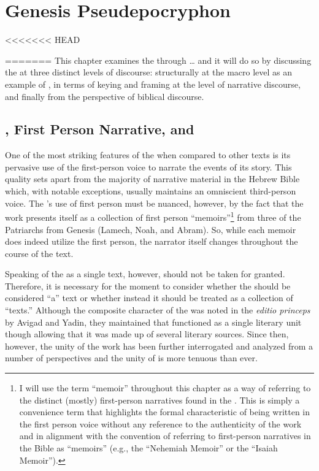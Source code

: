 
\chapter{Genesis Pseudepocryphon}

<<<<<<< HEAD




=======
 This chapter examines the \ga through \ldots{} and it will do so by discussing the \ga at three distinct levels of discourse: structurally at the macro level as an example of \psy, in terms of keying and framing at the level of narrative discourse, and finally from the perspective of biblical discourse.

 \section{\GA, First Person Narrative, and \Psy}

 One of the most striking features of the \ga when compared to other \rwb texts is its pervasive use of the first-person voice to narrate the events of its story. This quality sets \ga apart from the majority of narrative material in the Hebrew Bible which, with notable exceptions, usually maintains an omniscient third-person voice. The \ga's use of first person must be nuanced, however, by the fact that the work presents itself as a collection of first person ``memoirs''\footnote{I will use the term ``memoir'' throughout this chapter as a way of referring to the distinct (mostly) first-person narratives found in the \ga. This is simply a convenience term that highlights the formal characteristic of being written in the first person voice without any reference to the authenticity of the work and in alignment with the convention of referring to first-person narratives in the Bible as ``memoirs'' (e.g., the ``Nehemiah Memoir'' or the ``Isaiah Memoir'').} from three of the Patriarchs from Genesis (Lamech, Noah, and Abram). So, while each memoir does indeed utilize the first person, the narrator itself changes throughout the course of the text.
 
Speaking of the \ga as a single text, however, should not be taken for granted. Therefore, it is necessary for the moment to consider whether the \ga should be considered ``a'' text or whether instead it should be treated as a collection of ``texts.''  Although the composite character of the \ga was noted in the \emph{editio princeps} by Avigad and Yadin, they maintained that \ga functioned as a single literary unit though allowing that it was made up of several literary sources.\autocite[38]{avigad_yadin1956} Since then, however, the unity of the work has been further interrogated and analyzed from a number of perspectives and the unity of \ga is more tenuous than ever.

